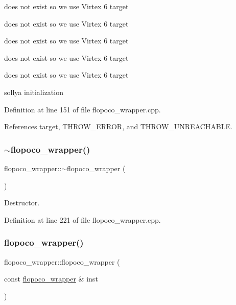 does not exist so we use Virtex 6 target

does not exist so we use Virtex 6 target

does not exist so we use Virtex 6 target

does not exist so we use Virtex 6 target

does not exist so we use Virtex 6 target

sollya initialization 

Definition at line 151 of file flopoco\+\_\+wrapper.\+cpp.



References target, T\+H\+R\+O\+W\+\_\+\+E\+R\+R\+OR, and T\+H\+R\+O\+W\+\_\+\+U\+N\+R\+E\+A\+C\+H\+A\+B\+LE.

\mbox{\label{classflopoco__wrapper_a0231fbfc514e9b11f4f2dfddc6d6240c}} 
\subsubsection{\texorpdfstring{$\sim$flopoco\+\_\+wrapper()}{~flopoco\_wrapper()}}
{\footnotesize\ttfamily flopoco\+\_\+wrapper\+::$\sim$flopoco\+\_\+wrapper (\begin{DoxyParamCaption}{ }\end{DoxyParamCaption})}



Destructor. 



Definition at line 221 of file flopoco\+\_\+wrapper.\+cpp.

\mbox{\label{classflopoco__wrapper_ad3cabcc4456dfdc78938fe6c8e83d1db}} 
\subsubsection{\texorpdfstring{flopoco\+\_\+wrapper()}{flopoco\_wrapper()}\hspace{0.1cm}{\footnotesize\ttfamily [2/2]}}
{\footnotesize\ttfamily flopoco\+\_\+wrapper\+::flopoco\+\_\+wrapper (\begin{DoxyParamCaption}\item[{const \hyperlink{classflopoco__wrapper}{flopoco\+\_\+wrapper} \&}]{inst }\end{DoxyParamCaption})\hspace{0.3cm}{\ttfamily [delete]}}



